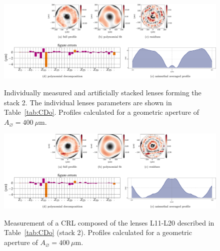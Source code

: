 \begin{refsection}
\begin{figure}[ht]
    \centering
    {\includegraphics[width=1.\linewidth]{figures/ch04b/CDo_individual.pdf}}
    \caption[Figure errors from the artificially stacked lenses - L11-L20]{Individually measured and artificially stacked lenses forming the stack 2. The individual lenses parameters are shown in Table~\ref{tab:CDo}. Profiles calculated for a geometric aperture of $A_{\diameter}=400~\mu\text{m}$.}
    \label{fig:accumulated_profile_2}
\end{figure}

\begin{figure}[ht]
    \centering
    {\includegraphics[width=1.\linewidth]{figures/ch04b/CDo_Stack.pdf}}
    \caption[Figure errors from stack 2]{Measurement of a CRL composed of the lenses L11-L20 described in Table~\ref{tab:CDo} (stack 2). Profiles calculated for a geometric aperture of $A_{\diameter}=400~\mu\text{m}$.}
    \label{fig:CDo}
\end{figure}

\clearpage


\printbibliography[heading=subbibliography]
\end{refsection}


